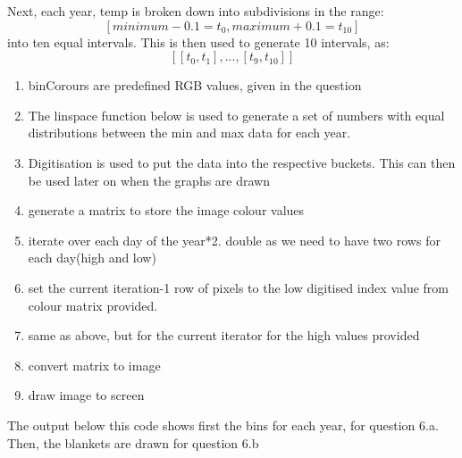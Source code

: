 \documentclass[11pt]{article}
\providecommand{\tightlist}{%
      \setlength{\itemsep}{0pt}\setlength{\parskip}{0pt}}
\begin{document}
Next, each year, temp is broken down into subdivisions in the range:
\[[minimum-0.1=t_0,maximum+0.1=t_10]\] into ten equal intervals. This is
then used to generate 10 intervals, as: \[[[t_0,t_1],...,[t_9,t_10]]\]

\begin{enumerate}
\def\labelenumi{\arabic{enumi}.}
\tightlist
\item
  binCorours are predefined RGB values, given in the question
\item
  The linspace function below is used to generate a set of numbers with
  equal distributions between the min and max data for each year.
\item
  Digitisation is used to put the data into the respective buckets. This
  can then be used later on when the graphs are drawn
\item
  generate a matrix to store the image colour values
\item
  iterate over each day of the year*2. double as we need to have two
  rows for each day(high and low)
\item
  set the current iteration-1 row of pixels to the low digitised index
  value from colour matrix provided.
\item
  same as above, but for the current iterator for the high values
  provided
\item
  convert matrix to image
\item
  draw image to screen
\end{enumerate}

The output below this code shows first the bins for each year, for
question 6.a. Then, the blankets are drawn for question 6.b
\end{document}
